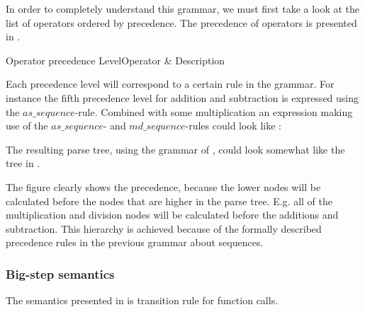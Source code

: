 In order to completely understand this grammar, we must first take a look at the list of
operators ordered by precedence. The precedence of operators is presented in
.

                  {Operator precedence}
           {Level}{Operator & Description}{
}

Each precedence level will correspond to a certain rule in the grammar. For
instance the fifth precedence level for addition and subtraction is expressed
using the $as\_sequence$-rule. Combined with some multiplication an expression
making use of the $as\_sequence$- and $md\_sequence$-rules could look like
:


The resulting parse tree, using the grammar of \productname{}, could look
somewhat like the tree in .



The figure clearly shows the precedence, because the lower nodes will be
calculated before the nodes that are higher in the parse tree. E.g. all of the
multiplication and division nodes will be calculated before the additions and
subtraction. This hierarchy is achieved because of the formally described
precedence rules in the previous grammar about sequences.

\subsubsection{Big-step semantics}

The semantics presented in  is transition rule for
function calls.



